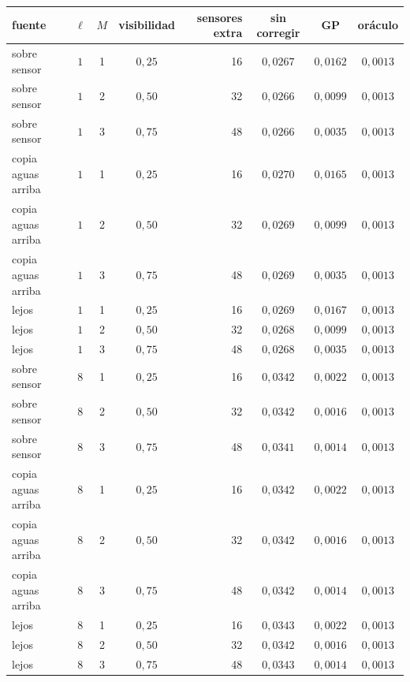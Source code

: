 \begin{tabular}{lcccrccc}
\toprule
fuente & $\ell$ & $M$ & visibilidad & sensores extra & sin corregir & GP & oráculo \\
\midrule
sobre sensor & $1$ & 1 & $0{,}25$ & 16 & $0{,}0267$ & $0{,}0162$ & $0{,}0013$ \\
sobre sensor & $1$ & 2 & $0{,}50$ & 32 & $0{,}0266$ & $0{,}0099$ & $0{,}0013$ \\
sobre sensor & $1$ & 3 & $0{,}75$ & 48 & $0{,}0266$ & $0{,}0035$ & $0{,}0013$ \\
copia aguas arriba & $1$ & 1 & $0{,}25$ & 16 & $0{,}0270$ & $0{,}0165$ & $0{,}0013$ \\
copia aguas arriba & $1$ & 2 & $0{,}50$ & 32 & $0{,}0269$ & $0{,}0099$ & $0{,}0013$ \\
copia aguas arriba & $1$ & 3 & $0{,}75$ & 48 & $0{,}0269$ & $0{,}0035$ & $0{,}0013$ \\
lejos & $1$ & 1 & $0{,}25$ & 16 & $0{,}0269$ & $0{,}0167$ & $0{,}0013$ \\
lejos & $1$ & 2 & $0{,}50$ & 32 & $0{,}0268$ & $0{,}0099$ & $0{,}0013$ \\
lejos & $1$ & 3 & $0{,}75$ & 48 & $0{,}0268$ & $0{,}0035$ & $0{,}0013$ \\
sobre sensor & $8$ & 1 & $0{,}25$ & 16 & $0{,}0342$ & $0{,}0022$ & $0{,}0013$ \\
sobre sensor & $8$ & 2 & $0{,}50$ & 32 & $0{,}0342$ & $0{,}0016$ & $0{,}0013$ \\
sobre sensor & $8$ & 3 & $0{,}75$ & 48 & $0{,}0341$ & $0{,}0014$ & $0{,}0013$ \\
copia aguas arriba & $8$ & 1 & $0{,}25$ & 16 & $0{,}0342$ & $0{,}0022$ & $0{,}0013$ \\
copia aguas arriba & $8$ & 2 & $0{,}50$ & 32 & $0{,}0342$ & $0{,}0016$ & $0{,}0013$ \\
copia aguas arriba & $8$ & 3 & $0{,}75$ & 48 & $0{,}0342$ & $0{,}0014$ & $0{,}0013$ \\
lejos & $8$ & 1 & $0{,}25$ & 16 & $0{,}0343$ & $0{,}0022$ & $0{,}0013$ \\
lejos & $8$ & 2 & $0{,}50$ & 32 & $0{,}0342$ & $0{,}0016$ & $0{,}0013$ \\
lejos & $8$ & 3 & $0{,}75$ & 48 & $0{,}0343$ & $0{,}0014$ & $0{,}0013$ \\
\bottomrule
\end{tabular}
